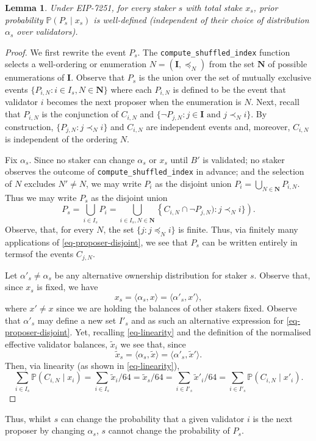 \documentclass{article}
\newcommand{\eb}{x}
\newcommand{\prob}{\mathbb P}
\newcommand{\teb}{\tilde{\eb}}
\newtheorem{lemma}{Lemma}
\begin{document}
\begin{lemma}
  Under EIP-7251, for every staker $s$ with total stake $\eb_s$,  prior
  probability  $\prob(P_s \mid \eb_s)$ is \emph{well-defined} (independent of
  their choice of distribution $\alpha_s$ over validators).
\end{lemma}
\begin{proof}
  We first rewrite the event $P_s$. The \texttt{compute\_shuffled\_index}
  function selects a well-ordering or enumeration $N = (\mathbf I, \preceq_N)$
  from the set $\mathbf N$ of possible enumerations of $\mathbf I$. Observe
  that $P_s$ is the union over the set of mutually exclusive events $\{P_{i, N}
  : i \in I_s, N \in \mathbf N\}$ where each $P_{i,N}$ is defined to be the
  event that validator $i$ becomes the next proposer when the enumeration is
  $N$. Next, recall that $P_{i, N}$ is the conjunction of $C_{i, N}$ and $\{\neg
  P_{j, N} : j \in \mathbf I \text{ and } j \prec_N i \}$. By construction,
  $\{P_{j, N} : j \prec_{N} i\}$ and $C_{i, N}$ are independent events and,
  moreover, $C_{i, N}$ is independent of the ordering $N$.

  Fix $\alpha_s$. Since no staker can change $\alpha_s$ or $\eb_s$ until $B'$ is
  validated; no staker observes the outcome of
  \texttt{compute\_shuffled\_index} in advance; and the selection of $N$
  excludes $N'\neq N$, we may write $P_i$ as the disjoint union  \(P_i  =
  \bigcup_{N \in \mathbf N} P_{i, N} \). Thus we may write $P_s$ as the
  disjoint union 
  \begin{equation}\label{eq-proposer-disjoint}
  P_s = \bigcup_{i \in I_s} P_i = \bigcup_{i \in I_s, N \in \mathbf N}
  \left\{ C_{i, N} \cap \neg P_{j, N}) : j \prec_{N} i\}\right).
  \end{equation}
  Observe, that, for every $N$, the set $\{j : j \preceq_N i\}$ is finite.
  Thus, via finitely many applications of \eqref{eq-proposer-disjoint}, we see
  that $P_s$ can be written entirely in termsof the events $C_{j, N}$.

  Let $\alpha'_s \neq \alpha_s$ be any alternative ownership distribution for
  staker $s$. Observe that, since $\eb_s$ is fixed, we have 
  \[
    \eb_s = \langle \alpha_s, \eb \rangle = \langle \alpha'_s, \eb' \rangle,
  \] 
  where $\eb' \neq \eb$ since we are holding the balances of other stakers fixed.
  Observe that $\alpha'_s$ may define a new set $I'_s$ and as such an alternative
  expression for \eqref{eq-proposer-disjoint}.
  Yet, recalling \eqref{eq-linearity} and the definition of the
  normalised effective validator balances, $\teb_i$ we see that, since 
  \[
    \teb_s = \langle \alpha_s, \teb\rangle
    = \langle \alpha'_s, \teb'\rangle. 
  \]
    Then, via linearity (as shown in \eqref{eq-linearity}),
  \begin{equation}
    \sum_{i \in I_s} \prob(C_{i, N} \mid \eb_i)
    = \sum_{i \in I_s} \teb_i / 64 = \teb_s / 64
    = \sum_{i \in I'_s} \teb'_i / 64
    = \sum_{i \in I'_s} \prob(C_{i, N} \mid \eb'_i).
  \end{equation}
\end{proof}
Thus, whilst $s$ can change the probability that a given validator
$i$ is the next proposer by changing $\alpha_s$, $s$ cannot change the
probability of $P_s$.
\end{document}
